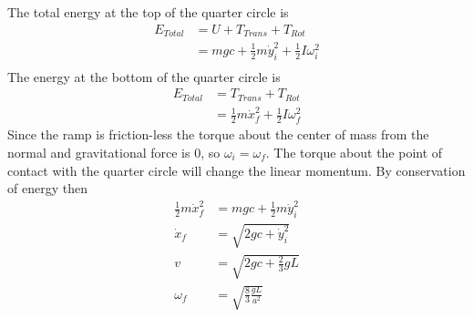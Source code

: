 The total energy at the top of the quarter circle is
\begin{equation}
    \begin{split}
        E_{Total} &= U + T_{Trans} + T_{Rot}\\
        &= mgc + \frac{1}{2}m\dot{y}_i^2 + \frac{1}{2}I\omega_i^2\\
    \end{split}
\end{equation}
The energy at the bottom of the quarter circle is
\begin{equation}
    \begin{split}
        E_{Total} &= T_{Trans} + T_{Rot}\\
        &= \frac{1}{2}m\dot{x}_f^2 + \frac{1}{2}I\omega_f^2
    \end{split}
\end{equation}
Since the ramp is friction-less the torque about the center of mass from the normal and gravitational force is $0$, so $\omega_i = \omega_f$. The torque about the point of contact with the quarter circle will change the linear momentum. By conservation of energy then
\begin{equation}
\begin{split}
    \frac{1}{2}m\dot{x}_f^2 &= mgc + \frac{1}{2}m\dot{y}_i^2\\
    \dot{x}_f &= \sqrt{2gc + \dot{y}_i^2}\\
    v &= \sqrt{2gc+\frac{2}{3}gL}\\
    \omega_f &= \sqrt{\frac{8}{3}\frac{gL}{a^2}}
\end{split}
\end{equation}

